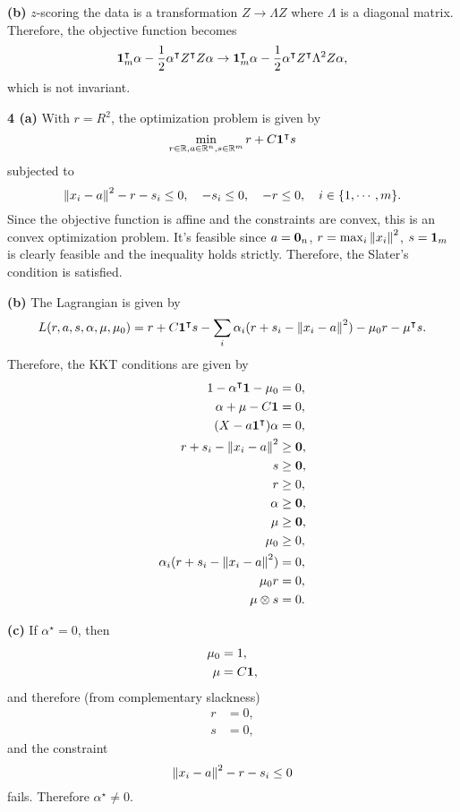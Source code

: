 \documentclass{article}
\makeatletter
\newcommand*{\shifttext}[1]{%
  \settowidth{\@tempdima}{#1}%
  \hspace{-\@tempdima}#1%
}
\newcommand{\plabel}[1]{%
\shifttext{\textbf{#1}\quad}%
}
\newcommand{\prule}{%
\begin{center}%
\hdashrule[0.5ex]{.99\linewidth}{1pt}{1pt 2.5pt}%
\end{center}%
}
\makeatother
\begin{document}
\plabel{(b)}%
$z$-scoring the data is a transformation $Z \rightarrow \Lambda Z$ where $\Lambda$ is a diagonal matrix.
Therefore, the objective function becomes
\[ \vb{1}_m^\intercal \alpha - \frac{1}{2} \alpha^\intercal Z^\intercal Z \alpha \rightarrow \vb{1}_m^\intercal \alpha - \frac{1}{2} \alpha^\intercal Z^\intercal \Lambda^2 Z \alpha, \]
which is not invariant.

\prule

\plabel{4 (a)}%
With $r = R^2$, the optimization problem is given by
\[ \min_{r\in\mathbb{R},a\in\mathbb{R}^n,s\in\mathbb{R}^m} r + C \vb{1}^\intercal s \]
subjected to
\[ \norm{x_i - a}^2 - r - s_i \le 0,\quad -s_i\le 0,\quad -r\le 0, \quad i \in \qty{1,\cdots,m}. \]
Since the objective function is affine and the constraints are convex, this is an convex optimization problem.
It's feasible since $a = \vb{0}_n$, $r = \max_i \norm{x_i}^2$, $s = \vb{1}_m$ is clearly feasible and the inequality holds strictly.
Therefore, the Slater's condition is satisfied.

\plabel{(b)}%
The Lagrangian is given by
\begin{align}
    \label{eq:L} L(r,a,s,\alpha,\mu,\mu_0) = r + C\vb{1}^\intercal s - \sum_i \alpha_i (r + s_i - \norm{x_i - a}^2) - \mu_0 r - \mu^\intercal s.
\end{align}
Therefore, the KKT conditions are given by
\begin{align*}
    1 - \alpha^\intercal \vb{1} - \mu_0 &= 0, \\
    \alpha + \mu - C \vb{1} &= 0, \\
    (X - a \vb{1}^\intercal) \alpha &= 0, \\
    r + s_i - \norm{x_i - a}^2 &\ge \vb{0}, \\
    s &\ge \vb{0}, \\
    r &\ge 0, \\
    \alpha &\ge \vb{0}, \\
    \mu &\ge \vb{0}, \\
    \mu_0 &\ge 0, \\
    \alpha_i(r + s_i - \norm{x_i - a}^2) &= 0, \\
    \mu_0 r &= 0, \\
    \mu \otimes s &= 0.
\end{align*}

\plabel{(c)}%
If $\alpha^\star = 0$, then
\begin{align*}
    \mu_0 &= 1, \\
    \mu &= C\vb{1},
\end{align*}
and therefore (from complementary slackness)
\begin{align*}
    r &= 0, \\
    s &= 0,
\end{align*}
and the constraint
\[ \norm{x_i - a}^2 - r - s_i \le 0 \]
fails.
Therefore $\alpha^\star \neq 0$.
\end{document}
